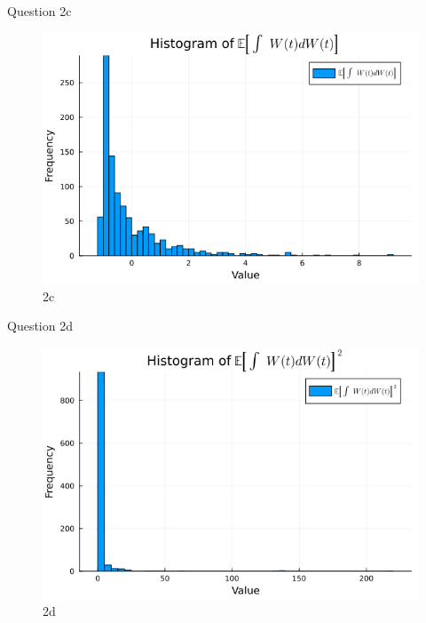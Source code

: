\documentclass[compress,12pt]{beamer}
\begin{document}
\begin{frame}{Question 2c}

      \begin{figure}[H]
            \centering
            \includegraphics[scale=0.5]{imgs/2c.png}
            \caption{2c}
            \label{fig:2c}
      \end{figure}
\end{frame}


\begin{frame}{Question 2d}
      \begin{figure}[H]
            \centering
            \includegraphics[scale=0.5]{imgs/2d.png}
            \caption{2d}
            \label{fig:2d}
      \end{figure}
\end{frame}
\end{document}
